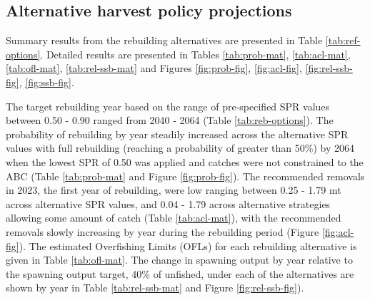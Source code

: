 \documentclass[11pt,
  english,
  a4paper,
]{article}
\begin{document}
\leavevmode\tagmcend\tagstructend\par


\hypertarget{alternative-harvest-policy-projections}{%
\subsection{Alternative harvest policy projections}\label{alternative-harvest-policy-projections}}

\leavevmode\tagmcend\tagstructend


Summary results from the rebuilding alternatives are presented in Table \ref{tab:ref-options}. Detailed results are presented in Tables \ref{tab:prob-mat}, \ref{tab:acl-mat}, \ref{tab:ofl-mat}, \ref{tab:rel-ssb-mat} and Figures \ref{fig:prob-fig}, \ref{fig:acl-fig}, \ref{fig:rel-ssb-fig}, \ref{fig:ssb-fig}.

\leavevmode\tagmcend\tagstructend\par


The target rebuilding year based on the range of pre-specified SPR values between 0.50 - 0.90 ranged from 2040 - 2064 (Table \ref{tab:reb-options}). The probability of rebuilding by year steadily increased across the alternative SPR values with full rebuilding (reaching a probability of greater than 50\%) by 2064 when the lowest SPR of 0.50 was applied and catches were not constrained to the ABC (Table \ref{tab:prob-mat} and Figure \ref{fig:prob-fig}). The recommended removals in 2023, the first year of rebuilding, were low ranging between 0.25 - 1.79 mt across alternative SPR values, and 0.04 - 1.79 across alternative strategies allowing some amount of catch (Table \ref{tab:acl-mat}), with the recommended removals slowly increasing by year during the rebuilding period (Figure \ref{fig:acl-fig}). The estimated Overfishing Limits (OFLs) for each rebuilding alternative is given in Table \ref{tab:ofl-mat}. The change in spawning output by year relative to the spawning output target, 40\% of unfished, under each of the alternatives are shown by year in Table \ref{tab:rel-ssb-mat} and Figure \ref{fig:rel-ssb-fig}).

\leavevmode\tagmcend\tagstructend\par

\end{document}
